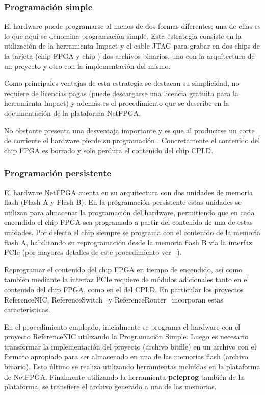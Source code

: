 \subsubsection{Programaci\'on simple}
El hardware puede programarse al menos de dos formas diferentes; una de ellas es lo que aqu\'i se denomina programaci\'on simple. Esta estrategia consiste en la utilizaci\'on de la herramienta Impact y el cable JTAG para grabar en dos chips de la tarjeta (chip FPGA y chip ) dos archivos binarios, uno con la arquitectura de un proyecto y otro con la implementaci\'on del mismo.

Como principales ventajas de esta estrategia se destacan su simplicidad, no requiere de licencias pagas (puede descargarse una licencia gratuita para la herramienta Impact) y adem\'as es el procedimiento que se describe en la documentaci\'on de la plataforma NetFPGA.

No obstante presenta una desventaja importante y es que al producirse un corte de corriente el hardware pierde su programación . Concretamente el contenido del chip FPGA es borrado y solo perdura el contenido del chip CPLD.

\subsubsection{Programaci\'on persistente}
El hardware NetFPGA cuenta en su arquitectura con dos unidades de memoria flash (Flash A y Flash B). En la programaci\'on persistente estas unidades se utilizan para almacenar la programaci\'on del hardware, permitiendo que en cada encendido el chip FPGA sea programado a partir del contenido de una de estas unidades. Por defecto el chip siempre se programa con el contenido de la memoria flash A, habilitando su reprogramaci\'on desde la memoria flash B v\'ia la interfaz PCIe (por mayores detalles de este procedimiento ver ~\citep{PCIEProgProject}).

Reprogramar el contenido del chip FPGA en tiempo de encendido, así como también mediante la interfaz PCIe requiere de módulos adicionales tanto en el contenido del chip FPGA, como en el del CPLD. En particular los proyectos ReferenceNIC\citep{ReferenceNICProject}, ReferenceSwitch~\citep{ReferenceSwitchProject} y ReferenceRouter~\citep{ReferenceRouterProject} incorporan estas características.

En el procedimiento empleado, inicialmente se programa el hardware con el proyecto ReferenceNIC utilizando la Programaci\'on Simple. Luego es necesario transformar la implementaci\'on del proyecto (archivo bitfile) en un archivo con el formato apropiado para ser almacenado en una de las memorias flash (archivo binario). Esto \'ultimo se realiza utilizando herramientas inclu\'idas en la plataforma de NetFPGA. Finalmente utilizando la herramienta \textbf{pcieprog} también de la plataforma, se transfiere el archivo generado a una de las memorias.

